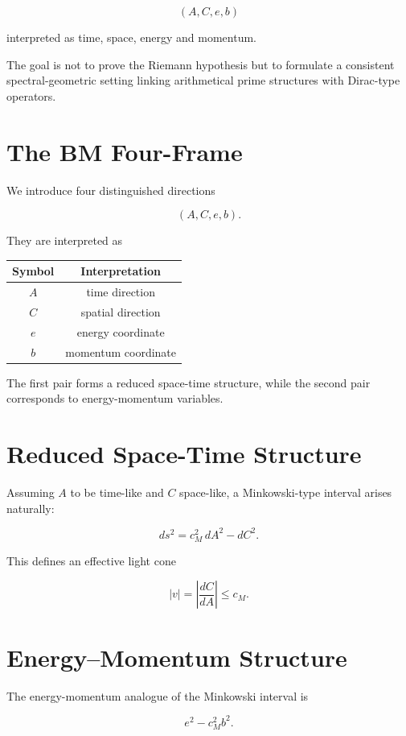 \documentclass[11pt,a4paper]{article}
\begin{document}
	\[
	(A,C,e,b)
	\]
	
	interpreted as time, space, energy and momentum.
	
	The goal is not to prove the Riemann hypothesis but to
	formulate a consistent spectral-geometric setting linking
	arithmetical prime structures with Dirac-type operators.
	
	\section{The BM Four-Frame}
	
	We introduce four distinguished directions
	
	\[
	(A,C,e,b).
	\]
	
	They are interpreted as
	
	\begin{center}
		\begin{tabular}{cc}
			Symbol & Interpretation \\
			\toprule
			$A$ & time direction \\
			$C$ & spatial direction \\
			$e$ & energy coordinate \\
			$b$ & momentum coordinate
		\end{tabular}
	\end{center}
	
	The first pair forms a reduced space-time structure,
	while the second pair corresponds to energy-momentum
	variables.
	
	\section{Reduced Space-Time Structure}
	
	Assuming $A$ to be time-like and $C$ space-like,
	a Minkowski-type interval arises naturally:
	
	\[
	ds^2 = c_M^2\,dA^2 - dC^2 .
	\]
	
	This defines an effective light cone
	
	\[
	|v|=\left|\frac{dC}{dA}\right| \le c_M .
	\]
	
	\section{Energy–Momentum Structure}
	
	The energy-momentum analogue of the Minkowski interval is
	
	\[
	e^2 - c_M^2 b^2.
	\]
	
\end{document}
